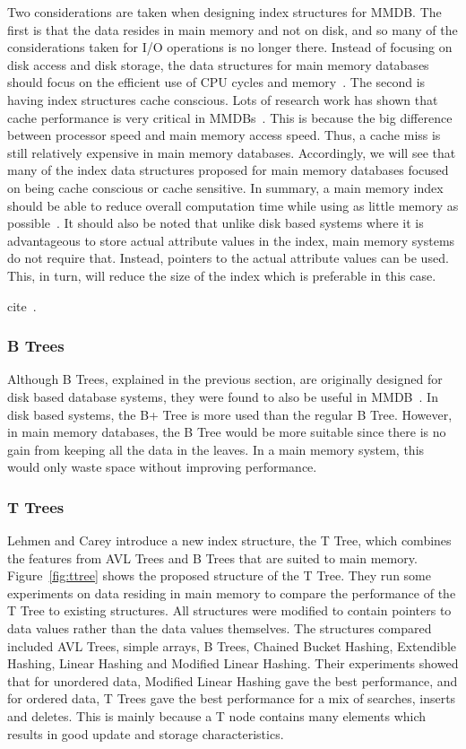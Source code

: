 \documentclass[12pt,a4paper]{article}
\begin{document}
Two considerations are taken when designing index structures for MMDB. The first is that the data resides in main memory and not on disk, and so many of the
considerations taken for I/O operations is no longer there. Instead of focusing on disk access and disk storage, the data structures for main memory
databases should focus on the efficient use of CPU cycles and memory~\cite{lehman1986study}. The second is having index structures cache conscious. Lots of
research work has shown that cache performance is very critical in MMDBs~\cite{boncz1999database,rao1999cache}. This is because the big difference between
processor speed and main memory access speed. Thus, a cache miss is still relatively expensive in main memory databases. Accordingly, we will see that many of
the index data structures proposed for main memory databases focused on being cache conscious or cache sensitive. In summary, a main memory index should be
able to reduce overall computation time while using as little memory as possible~\cite{lehman1986study}. It should also be noted that unlike disk based systems
where it is advantageous to store actual attribute values in the index, main memory systems do not require that. Instead, pointers to the actual attribute
values can be used. This, in turn, will reduce the size of the index which is preferable in this case.

cite~\cite{dewitt1984implementation}.

\subsubsection*{B Trees}
Although B Trees, explained in the previous section, are originally designed for disk based database systems, they were found to also be useful in
MMDB~\cite{lehman1986study}. In disk based systems, the B+ Tree is more used than the regular B Tree. However, in main memory databases, the B Tree would be
more suitable since there is no gain from keeping all the data in the leaves. In a main memory system, this would only waste space without improving
performance.


\subsubsection*{T Trees}
Lehmen and Carey introduce a new index structure, the T Tree, which combines the features from AVL Trees and B Trees that are suited to main memory.
Figure~\ref{fig:ttree} shows the proposed structure of the T Tree. They run some experiments on data residing in main memory to compare the performance of the T
Tree to existing structures. All structures were modified to contain pointers to data values rather than the data values themselves. The structures
compared included  AVL Trees, simple arrays, B Trees, Chained Bucket Hashing, Extendible Hashing, Linear Hashing and Modified Linear Hashing. Their
experiments showed that for unordered data, Modified Linear Hashing gave the best performance, and for ordered data, T Trees gave the best performance for a mix
of searches, inserts and deletes. This is mainly because a T node contains many elements which results in good update and storage characteristics.
\end{document}
